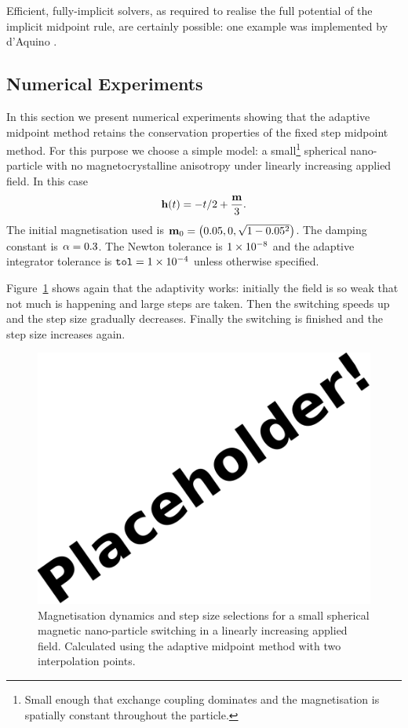 Efficient, fully-implicit solvers, as required to realise the full potential of the implicit midpoint rule, are certainly possible: one example was implemented by d'Aquino \etal.\cite{DAquino2005}


\subsection{Numerical Experiments}

In this section we present numerical experiments showing that the adaptive midpoint method retains the conservation properties of the fixed step midpoint method.
For this purpose we choose a simple model: a small\footnote{Small enough that exchange coupling dominates and the magnetisation is spatially constant throughout the particle.} spherical nano-particle with no magnetocrystalline anisotropy under linearly increasing applied field.
In this case
\begin{equation}
  \mathbf{h}(t) = - t/2 +  \frac{\mathbf{m}}{3}.
\end{equation}
The initial magnetisation used is $\mathbf{m}_0 = \left( 0.05, 0, \sqrt{1 - 0.05^2} \right)$.
The damping constant is $\alpha = 0.3$.
The Newton tolerance is $1\times 10^{-8}$ and the adaptive integrator tolerance is ${\textrm{\textup{\texttt{tol}}}} = 1\times 10^{-4}$ unless otherwise specified.

Figure~\ref{fig:linear-field-switch-mp} shows again that the adaptivity works: initially the field is so weak that not much is happening and large steps are taken.
Then the switching speeds up and the step size gradually decreases.
Finally the switching is finished and the step size increases again.

\begin{figure}[ht!]
  \centering
  \includegraphics{images/placeholder}
  \caption{Magnetisation dynamics and step size selections for a small spherical magnetic nano-particle switching in a linearly increasing applied field. Calculated using the adaptive midpoint method with two interpolation points.}
  \label{fig:linear-field-switch-mp}
\end{figure}

